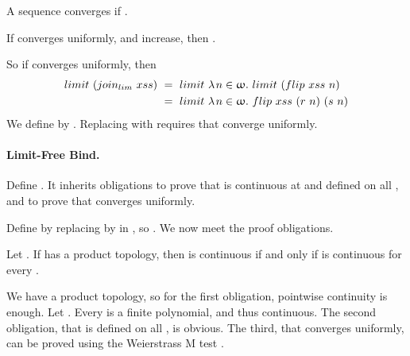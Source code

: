 \begin{definition}
\label{def:uniform-convergence}
A sequence  converges  if
.
\end{definition}

\begin{lemma}
If  converges uniformly, and  increase, then .
\end{lemma}

So if  converges uniformly, then
\begin{equation}
\begin{aligned}
limit~(join_{lim}~xss)
 &\ =\  limit~\lambda\mspace{2mu}{n \in \upomega}\ldotp\, limit~(flip~xss~n) \\
 &\ =\  limit~\lambda\mspace{2mu}{n \in \upomega}\ldotp\, flip~xss~(r~n)~(s~n)
\end{aligned}
\end{equation}
We define  by . Replacing  with  requires that  converge uniformly.

\paragraph{Limit-Free Bind.}
Define . It inherits obligations to prove that  is continuous at  and defined on all , and to prove that  converges uniformly.

\begin{example}
Define  by replacing  by  in , so . We now meet the proof obligations.

\begin{lemma}
Let . If  has a product topology, then  is continuous if and only if  is continuous for every .
\end{lemma}

We have a product topology, so for the first obligation, pointwise continuity is enough. Let . Every  is a finite polynomial, and thus continuous.
The second obligation, that  is defined on all , is obvious.
The third, that  converges uniformly, can be proved using the Weierstrass M test \cite[Theorem 6.4.5]{cit:abbott-analysis}.
\exampleqed
\end{example}

